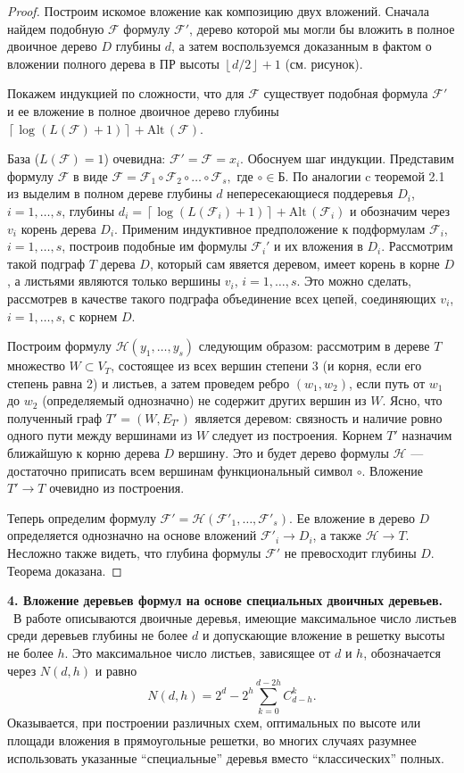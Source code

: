 \documentclass[12pt, a4paper]{article}
\theoremstyle{plain}
\theoremstyle{definition}
\theoremstyle{definition}
\newcommand{\floor}[1]{\left\lfloor{#1}\right\rfloor}
\newcommand{\ceil}[1]{\left\lceil{#1}\right\rceil}
\newcommand{\Alt}{\mathrm{Alt}\,}
\renewcommand{\C}[2]{C_{#1}^{#2}}
\newcommand{\F}{\mathscr{F}}
\begin{document}
\begin{proof} 
Построим искомое вложение как композицию двух вложений.
Сначала найдем  подобную $\F$ формулу $\F'$, дерево которой мы могли бы вложить в
полное двоичное дерево $D$ глубины $d$,
а затем воспользуемся доказанным в \cite{lidamin} фактом о вложении полного дерева в ПР высоты $\floor{d/2}+1$ (см. рисунок).

Покажем индукцией по сложности, что для $\F$ существует подобная формула $\F'$ и ее вложение в полное 
двоичное дерево глубины $\ceil{\log (L(\F) + 1)} + \Alt(\F)$.

База ($L(\F) = 1$) очевидна: $\F' = \F = x_i$.
Обоснуем шаг индукции.
Представим формулу $\F$ в виде
$
	\F = \F_1 \circ \F_2 \circ \dots \circ \F_s,
$
где $\circ \in Б$. По аналогии c теоремой 2.1 из \cite{cyber} выделим	 в полном дереве глубины $d$ непересекающиеся поддеревья $D_i$, $i=1,\dots,s$, глубины $d_i = \ceil{\log (L(\F_i) + 1)} + \Alt(\F_i)$ и обозначим через $v_i$ корень дерева $D_i$. Применим индуктивное предположение к
подформулам $\F_i$, $i=1,\dots,s$, построив подобные им формулы $\F_i'$
и их вложения в $D_i$. Рассмотрим такой подграф $T$ дерева $D$, который сам явяется деревом, имеет корень в корне $D$, а листьями являются только вершины $v_i$, $i=1,\dots,s$. 
Это можно сделать, рассмотрев в качестве такого подграфа объединение всех цепей, соединяющих $v_i$, $i=1,\dots,s$, с корнем $D$.

Построим формулу $\mathscr{H}(y_1, \dots, y_s)$ следующим образом:
рассмотрим в дереве $T$ множество $W \subset V_T$, состоящее из всех вершин степени 3 (и корня, если его степень равна 2) и листьев, а затем 
проведем ребро $(w_1, w_2)$, если путь от $w_1$ до $w_2$ (определяемый однозначно)
не содержит других вершин из $W$.
Ясно, что полученный граф $T' = (W, E_{T'})$ является деревом:
связность и наличие ровно одного пути между вершинами из $W$ следует из построения. Корнем $T'$ назначим ближайшую к корню дерева $D$ вершину.
Это и будет дерево формулы $\mathscr{H}$ --- достаточно приписать всем вершинам функциональный символ
$\circ$. Вложение $T' \rightarrow T$ очевидно из построения. 


Теперь определим формулу $\F' = \mathscr{H}(\F'_1, \dots, \F'_s)$. 
Ее вложение в дерево $D$ определяется однозначно на основе вложений
$\F'_i \rightarrow D_i$, а также $\mathscr{H} \rightarrow T$. 
Несложно также видеть, что глубина формулы $\F'$
не превосходит глубины $D$.
Теорема доказана.
\end{proof}
\bigskip

{\bfseries 4. Вложение деревьев формул на основе специальных двоичных деревьев.} \
В работе \cite{lidamindis} описываются двоичные деревья,
имеющие максимальное число листьев среди деревьев глубины не
более $d$ и допускающие вложение в решетку высоты не более
$h$. Это максимальное число листьев, зависящее от $d$ и $h$, обозначается через $N(d,h)$ и равно 
\[
	N(d, h) = 2^d - 2^h \sum_{k = 0}^{d - 2h} \C{d-h}{k}.
\]
Оказывается, при построении различных схем, оптимальных по высоте или площади вложения в прямоугольные решетки, во многих случаях
разумнее использовать указанные ``специальные'' деревья вместо ``классических''  полных.
\smallskip
\end{document}
